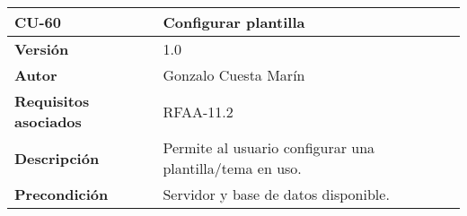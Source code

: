 \begin{longtable}[]{@{}ll@{}}
\toprule
\begin{minipage}[b]{0.23\columnwidth}\raggedright
\textbf{CU-60}\strut
\end{minipage} & \begin{minipage}[b]{0.71\columnwidth}\raggedright
\textbf{Configurar plantilla}\strut
\end{minipage}\tabularnewline
\midrule
\endhead
\begin{minipage}[t]{0.23\columnwidth}\raggedright
\textbf{Versión}\strut
\end{minipage} & \begin{minipage}[t]{0.71\columnwidth}\raggedright
1.0\strut
\end{minipage}\tabularnewline
\begin{minipage}[t]{0.23\columnwidth}\raggedright
\textbf{Autor}\strut
\end{minipage} & \begin{minipage}[t]{0.71\columnwidth}\raggedright
Gonzalo Cuesta Marín\strut
\end{minipage}\tabularnewline
\begin{minipage}[t]{0.23\columnwidth}\raggedright
\textbf{Requisitos asociados}\strut
\end{minipage} & \begin{minipage}[t]{0.71\columnwidth}\raggedright
RFAA-11.2\strut
\end{minipage}\tabularnewline
\begin{minipage}[t]{0.23\columnwidth}\raggedright
\textbf{Descripción}\strut
\end{minipage} & \begin{minipage}[t]{0.71\columnwidth}\raggedright
Permite al usuario configurar una plantilla/tema en uso.\strut
\end{minipage}\tabularnewline
\begin{minipage}[t]{0.23\columnwidth}\raggedright
\textbf{Precondición}\strut
\end{minipage} & \begin{minipage}[t]{0.71\columnwidth}\raggedright
Servidor y base de datos disponible.


\end{minipage}
\end{longtable}
